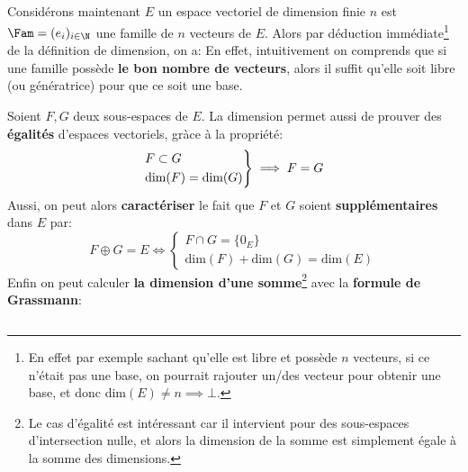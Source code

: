 \subsection*{}

Considérons maintenant \(E\) un espace vectoriel de dimension finie \(n\) est \(\Fam = (e_i)_{i \in \N}\) une famille de \(n\) vecteurs de \(E\).\+
Alors par déduction immédiate\footnote[2]{En effet par exemple sachant qu'elle est libre et possède \(n\) vecteurs, si ce n'était pas une base, on pourrait rajouter un/des vecteur pour obtenir une base, et donc dim\((E) \neq n \implies \bot\).} de la définition de dimension, on a:
En effet, intuitivement on comprends que si une famille possède \textbf{le bon nombre de vecteurs}, alors il suffit qu'elle soit libre (ou génératrice) pour que ce soit une base.\<

Soient \(F, G\) deux sous-espaces de \(E\). La dimension permet aussi de prouver des \textbf{égalités} d'espaces vectoriels, gràce à la propriété:
\[
   \begin{rcases}
      F \subset G \\
      \text{dim}(F) = \text{dim}(G)
   \end{rcases}\implies F = G
\]
Aussi, on peut alors \textbf{caractériser} le fait que \(F\) et \(G\) soient \textbf{supplémentaires} dans \(E\) par:
\[
   F \oplus G = E \Longleftrightarrow \begin{cases}
      F \cap G = \{0_E\}\\
      \text{dim}(F) + \text{dim}(G) = \text{dim}(E)
   \end{cases}
\]
Enfin on peut calculer \textbf{la dimension d'une somme}\footnote[1]{Le cas d'égalité est intéressant car il intervient pour des sous-espaces d'intersection nulle, et alors la dimension de la somme est simplement égale à la somme des dimensions.} avec la \textbf{formule de Grassmann}:


\subsection*{}

